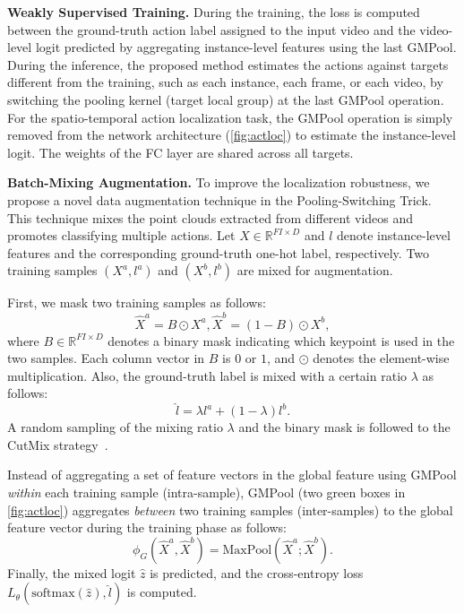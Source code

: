 \documentclass[10pt,twocolumn,letterpaper]{article}
\begin{document}
\noindent \textbf{Weakly Supervised Training.}
During the training, the loss is computed between the ground-truth action label assigned to the input video and the video-level logit predicted by aggregating instance-level features using the last GMPool.
During the inference, the proposed method estimates the actions against targets different from the training, such as each instance, each frame, or each video, by switching the pooling kernel (target local group) at the last GMPool operation.
For the spatio-temporal action localization task, the GMPool operation is simply removed from the network architecture (\cref{fig:actloc}) to estimate the instance-level logit.
The weights of the FC layer are shared across all targets.

\noindent \textbf{Batch-Mixing Augmentation.}
To improve the localization robustness, we propose a novel data augmentation technique in the Pooling-Switching Trick. This technique mixes the point clouds extracted from different videos and promotes classifying multiple actions.
Let $X \in \mathbb{R}^{FI \times D}$ and $l$ denote instance-level features and the corresponding ground-truth one-hot label, respectively.
Two training samples $(X^a, l^a)$ and $(X^b, l^b)$ are mixed for augmentation.

First, we mask two training samples as follows:
\begin{equation}
\hat{X}^a = B \odot X^a, \hat{X}^b = (1-B) \odot X^b,
\end{equation}
where $B \in \mathbb{R}^{FI \times D}$ denotes a binary mask indicating which keypoint is used in the two samples.
Each column vector in $B$ is $0$ or $1$, and $\odot$ denotes the element-wise multiplication.
Also, the ground-truth label is mixed with a certain ratio $\lambda$ as follows:
\begin{equation}
\hat{l} = \lambda l^a + (1-\lambda)l^b.
\end{equation}
A random sampling of the mixing ratio $\lambda$ and the binary mask is followed to the CutMix strategy~\cite{Yun2019ICCV}.

Instead of aggregating a set of feature vectors in the global feature using GMPool \textit{within} each training sample (intra-sample), GMPool (two green boxes in \cref{fig:actloc}) aggregates \textit{between} two training samples (inter-samples) to the global feature vector during the training phase as follows:
\begin{equation}
  \phi_G\left(\hat{X}^a, \hat{X}^b\right) = \mathrm{MaxPool}(\hat{X}^a; \hat{X}^b).
\end{equation}
Finally, the mixed logit $\hat{z}$ is predicted, and the cross-entropy loss $L_\theta\left(\mathrm{softmax}\left(\hat{z}\right), \hat{l} \right)$ is computed.
\end{document}
